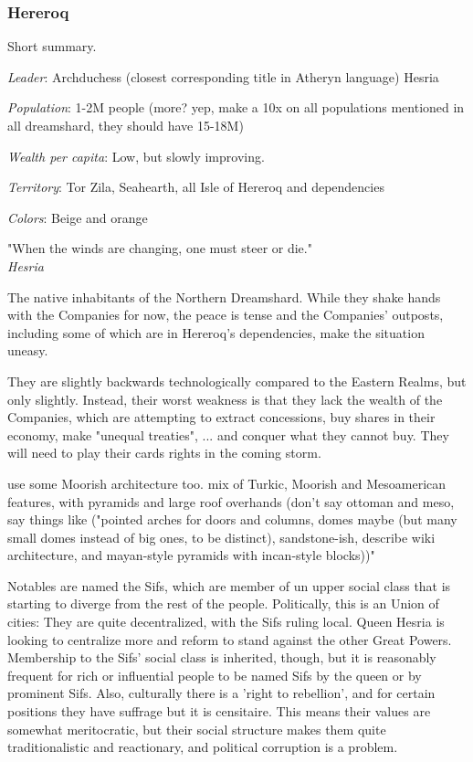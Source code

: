 \subsubsection{Hereroq}


Short summary.


\textit{Leader}: Archduchess (closest corresponding title in Atheryn language) Hesria

\textit{Population}: 1-2M people (more? yep, make a 10x on all populations mentioned in all dreamshard, they should have 15-18M)

\textit{Wealth per capita}: Low, but slowly improving.

\textit{Territory}: Tor Zila, Seahearth, all Isle of Hereroq and dependencies
    
\textit{Colors}: Beige and orange


\begin{rpg-quotebox}
    "When the winds are changing, one must steer or die." \\ \textendash \textit{Hesria}
    \end{rpg-quotebox}


The native inhabitants of the Northern Dreamshard. While they shake hands with the Companies for now, the peace is tense and the Companies' outposts, including some of which are in Hereroq's dependencies, make the situation uneasy.


They are slightly backwards technologically compared to the Eastern Realms, but only slightly. Instead, their worst weakness is that they lack the wealth of the Companies, which are attempting to extract concessions, buy shares in their economy, make "unequal treaties", ... and conquer what they cannot buy. They will need to play their cards rights in the coming storm. 

use some Moorish architecture too. mix of Turkic, Moorish and Mesoamerican features, with pyramids and large roof overhands (don't say ottoman and meso, say things like ("pointed arches for doors and columns, domes maybe (but many small domes instead of big ones, to be distinct), sandstone-ish, describe wiki architecture, and mayan-style pyramids with incan-style blocks))"

Notables are named the Sifs, which are member of un upper social class that is starting to diverge from the rest of the people. Politically, this is an Union of cities: They are quite decentralized, with the Sifs ruling local. Queen Hesria is looking to centralize more and reform to stand against the other Great Powers. Membership to the Sifs' social class is inherited, though, but it is reasonably frequent for rich or influential people to be named Sifs by the queen or by prominent Sifs.  Also, culturally there is a 'right to rebellion', and for certain positions they have suffrage but it is censitaire.  This means their values are somewhat meritocratic, but their social structure makes them quite traditionalistic and reactionary, and political corruption is a problem.

